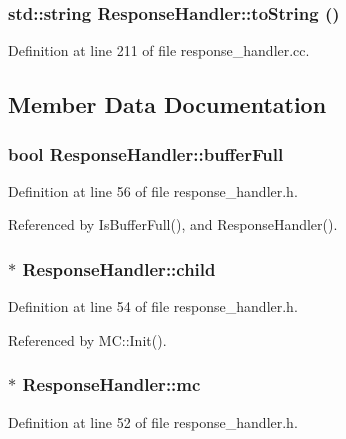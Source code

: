 \subsubsection[{toString}]{\setlength{\rightskip}{0pt plus 5cm}std::string ResponseHandler::toString ()}\label{classResponseHandler_ac99b1af9c28c04a3464ef5c60782977}




Definition at line 211 of file response\_\-handler.cc.

\subsection{Member Data Documentation}
\subsubsection[{bufferFull}]{\setlength{\rightskip}{0pt plus 5cm}bool {\bf ResponseHandler::bufferFull}}\label{classResponseHandler_205a337393bf8375b9aa5395e463011a}




Definition at line 56 of file response\_\-handler.h.

Referenced by IsBufferFull(), and ResponseHandler().
\subsubsection[{child}]{$\ast$ {\bf ResponseHandler::child}}\label{classResponseHandler_6e4e0448a89ea693f626e47d3c35214c}




Definition at line 54 of file response\_\-handler.h.

Referenced by MC::Init().
\subsubsection[{mc}]{$\ast$ {\bf ResponseHandler::mc}}\label{classResponseHandler_2181e0b35d08dcc8fc31a47ff29bcdd7}




Definition at line 52 of file response\_\-handler.h.

